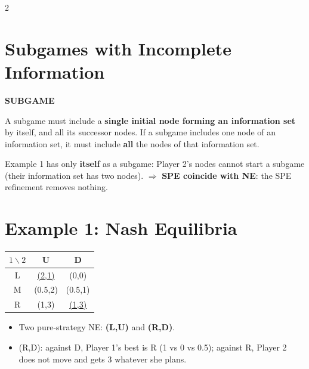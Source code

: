 \documentclass[a4paper,9pt]{extarticle}
\begin{document}
\begin{multicols}{2}
\begin{important}
\end{important}



\section{Subgames with Incomplete Information}


\begin{definition}

\textbf{SUBGAME}

A subgame must include a \textbf{single initial node forming an information set} by itself,
and all its successor nodes. If a subgame includes one node of an information set, it must
include \textbf{all} the nodes of that information set.

\end{definition}


\begin{warning}

Example 1 has only \textbf{itself} as a subgame: Player 2's nodes cannot start a subgame
(their information set has two nodes). $\Rightarrow$ \textbf{SPE coincide with NE}: the SPE
refinement removes nothing.

\end{warning}



\section{Example 1: Nash Equilibria}


\begin{center}
\begin{tabular}{c|cc}
$1 \backslash 2$ & U & D \\
\hline
L & \underline{(2,1)} & (0,0) \\
M & (0.5,2) & (0.5,1) \\
R & (1,3) & \underline{(1,3)} \\
\end{tabular}
\end{center}


\begin{itemize}

\item Two pure-strategy NE: \textbf{(L,U)} and \textbf{(R,D)}.

\item (R,D): against D, Player 1's best is R (1 vs 0 vs 0.5); against R, Player 2 does not
move and gets 3 whatever she plans.


\end{itemize}
\end{multicols}
\end{document}
